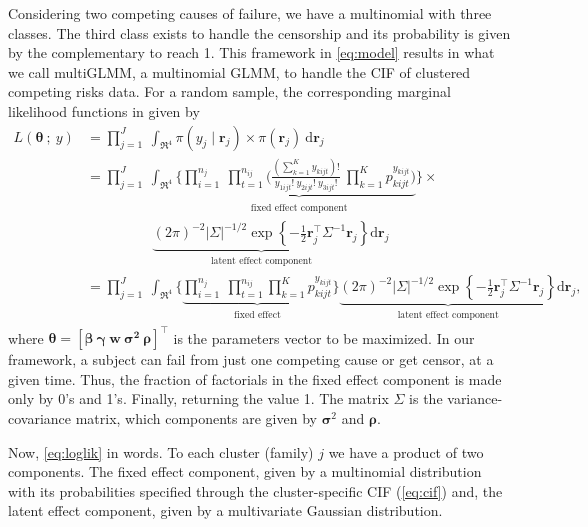 Considering two competing causes of failure, we have a multinomial with
three classes. The third class exists to handle the censorship and its
probability is given by the complementary to reach 1. This framework in
\autoref{eq:model} results in what we call multiGLMM, a multinomial
GLMM, to handle the CIF of clustered competing risks data. For a random
sample, the corresponding marginal likelihood functions in given by
\begin{align}
  L(\bm{\theta}~;~y)
  &= \prod_{j=1}^{J}~\int_{\Re^{4}}
    \pi(y_{j} \mid \bm{r}_{j})\times\pi(\bm{r}_{j})~\text{d}\bm{r}_{j}
    \nonumber\\
  &= \prod_{j=1}^{J}~\int_{\Re^{4}}
    \Bigg\{
    \underbrace{\prod_{i=1}^{n_{j}}~\prod_{t=1}^{n_{ij}}
    \Bigg(
    \frac{(\sum_{k=1}^{K}y_{kijt})!}{y_{1ijt}!~y_{2ijt}!~y_{3ijt}!}~
    \prod_{k=1}^{K} p_{kijt}^{y_{kijt}}
    \Bigg)}_{\substack{\text{fixed effect component}}}
  \Bigg\}\times\nonumber\\
  &\hspace{2cm}\underbrace{
    (2\pi)^{-2} |\Sigma|^{-1/2} \exp
    \left\{-\frac{1}{2}\bm{r}_{j}^{\top} \Sigma^{-1} \bm{r}_{j}\right\}
    }_{\substack{\text{latent effect component}}}
    \text{d}\bm{r}_{j}\nonumber\\
  &= \prod_{j=1}^{J}~\int_{\Re^{4}}
    \Bigg\{
    \underbrace{\prod_{i=1}^{n_{j}}~\prod_{t=1}^{n_{ij}}
    \prod_{k=1}^{K} p_{kijt}^{y_{kijt}}
    }_{\substack{\text{fixed effect}}}
  \Bigg\}\underbrace{
  (2\pi)^{-2} |\Sigma|^{-1/2} \exp
  \left\{-\frac{1}{2}\bm{r}_{j}^{\top} \Sigma^{-1} \bm{r}_{j}\right\}
  }_{\substack{\text{latent effect component}}}
  \text{d}\bm{r}_{j}\label{eq:loglik},
\end{align}
where \(\bm{\theta} = [\bm{\beta}~\bm{\gamma}~\bm{w}~\bm{\sigma^{2}}~
\bm{\rho}]^{\top}\) is the parameters vector to be maximized. In our
framework, a subject can fail from just one competing cause or get
censor, at a given time. Thus, the fraction of factorials in the fixed
effect component is made only by 0's and 1's. Finally, returning the
value 1. The matrix \(\Sigma\) is the variance-covariance matrix, which
components are given by \(\bm{\sigma}^{2}\) and \(\bm{\rho}\).

Now, \autoref{eq:loglik} in words. To each cluster (family) \(j\) we
have a product of two components. The fixed effect component, given by a
multinomial distribution with its probabilities specified through the
cluster-specific CIF (\autoref{eq:cif}) and, the latent effect
component, given by a multivariate Gaussian distribution.

